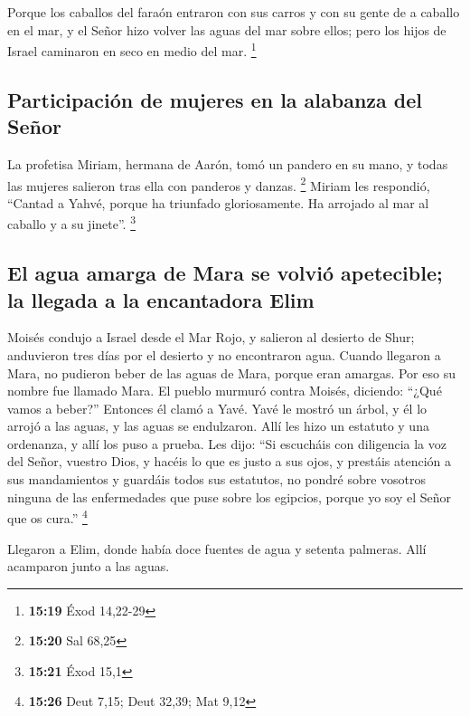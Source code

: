 \begin{paracol}{2}
 Porque los caballos del faraón entraron con sus carros y
con su gente de a caballo en el mar, y el Señor hizo volver las aguas
del mar sobre ellos; pero los hijos de Israel caminaron en seco en medio
del mar. \footnote{\textbf{15:19} Éxod 14,22-29}

\hypertarget{participaciuxf3n-de-mujeres-en-la-alabanza-del-seuxf1or}{%
\subsection{Participación de mujeres en la alabanza del
Señor}\label{participaciuxf3n-de-mujeres-en-la-alabanza-del-seuxf1or}}

 La profetisa Miriam, hermana de Aarón, tomó un pandero
en su mano, y todas las mujeres salieron tras ella con panderos y
danzas. \footnote{\textbf{15:20} Sal 68,25}  Miriam les
respondió, ``Cantad a Yahvé, porque ha triunfado gloriosamente. Ha
arrojado al mar al caballo y a su jinete''. \footnote{\textbf{15:21}
  Éxod 15,1}

\hypertarget{el-agua-amarga-de-mara-se-volviuxf3-apetecible-la-llegada-a-la-encantadora-elim}{%
\subsection{El agua amarga de Mara se volvió apetecible; la llegada a la
encantadora
Elim}\label{el-agua-amarga-de-mara-se-volviuxf3-apetecible-la-llegada-a-la-encantadora-elim}}

 Moisés condujo a Israel desde el Mar Rojo, y salieron al
desierto de Shur; anduvieron tres días por el desierto y no encontraron
agua.  Cuando llegaron a Mara, no pudieron beber de las
aguas de Mara, porque eran amargas. Por eso su nombre fue llamado Mara.
 El pueblo murmuró contra Moisés, diciendo: ``¿Qué vamos
a beber?''  Entonces él clamó a Yavé. Yavé le mostró un
árbol, y él lo arrojó a las aguas, y las aguas se endulzaron. Allí les
hizo un estatuto y una ordenanza, y allí los puso a prueba.
 Les dijo: ``Si escucháis con diligencia la voz del
Señor, vuestro Dios, y hacéis lo que es justo a sus ojos, y prestáis
atención a sus mandamientos y guardáis todos sus estatutos, no pondré
sobre vosotros ninguna de las enfermedades que puse sobre los egipcios,
porque yo soy el Señor que os cura.'' \footnote{\textbf{15:26} Deut
  7,15; Deut 32,39; Mat 9,12}

 Llegaron a Elim, donde había doce fuentes de agua y
setenta palmeras. Allí acamparon junto a las aguas.


\end{paracol}
